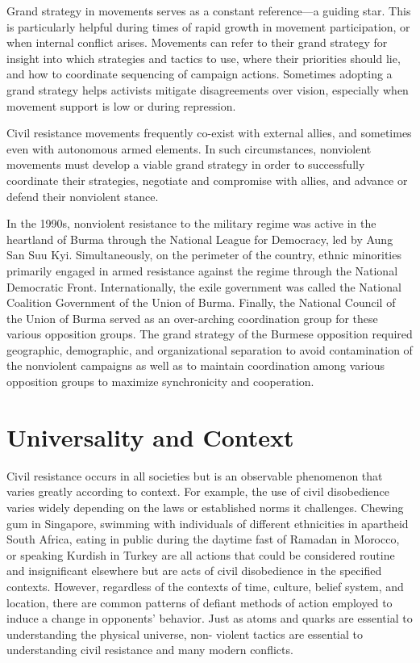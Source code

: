 \documentclass[twoside,a4paper,12pt,fleqn,openany]{extbook}
\begin{document}
Grand strategy in movements serves as a constant reference—a guiding star. This is particularly helpful during times of rapid growth in movement participation, or when internal conflict arises. Movements can refer to their grand strategy for insight into which strategies and tactics to use, where their priorities should lie, and how to coordinate sequencing of campaign actions. Sometimes adopting a grand strategy helps activists mitigate disagreements over vision, especially when movement support is low or during repression.

Civil resistance movements frequently co-exist with external allies, and sometimes even with autonomous armed elements. In such circumstances, nonviolent movements must develop a viable grand strategy in order to successfully coordinate their strategies, negotiate and compromise with allies, and advance or defend their nonviolent stance.

In the 1990s, nonviolent resistance to the military regime was active in the heartland of Burma through the National League for Democracy, led by Aung San Suu Kyi. Simultaneously, on the perimeter of the country, ethnic minorities primarily engaged in armed resistance against the regime through the National Democratic Front. Internationally, the exile government was called the National Coalition Government of the Union of Burma. Finally, the National Council of the Union of Burma served as an over-arching coordination group for these various opposition groups. The grand strategy of the Burmese opposition required geographic, demographic, and organizational separation to avoid contamination of the nonviolent campaigns as well as to maintain coordination among various opposition groups to maximize synchronicity and cooperation.

\section*{Universality and Context}

Civil resistance occurs in all societies but is an observable phenomenon that varies greatly according to context. For example, the use of civil disobedience varies widely depending on the laws or established norms it challenges. Chewing gum in Singapore, swimming with individuals of different ethnicities in apartheid South Africa, eating in public during the daytime fast of Ramadan in Morocco, or speaking Kurdish in Turkey are all actions that could be considered routine and insignificant elsewhere but are acts of civil disobedience in the specified contexts. However, regardless of the contexts of time, culture, belief system, and location, there are common patterns of defiant methods of action employed to induce a change in opponents’ behavior. Just as atoms and quarks are essential to understanding the physical universe, non-
violent tactics are essential to understanding civil resistance and many modern conflicts.
\end{document}
